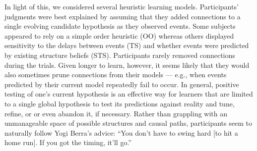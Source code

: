 \documentclass[10pt,letterpaper]{article}
\newcommand{\ttodo}[2][]
{\todo[caption={#2}, size=\small, #1, color = orange, inline]{\renewcommand{\baselinestretch}{1}\selectfont \textbf{TG}: #2}~}
\begin{document}
In light of this, we considered several heuristic learning models. Participants' judgments were best explained by assuming that they added connections to a single evolving candidate hypothesis as they observed events. Some subjects appeared to rely on a simple order heuristic (OO) whereas others displayed sensitivity to the delays between events (TS) and whether events were predicted by existing structure beliefs (STS).  Participants rarely removed connections during the trials. Given longer to learn, however, it seems likely that they would also sometimes prune connections from their models --- e.g., when events predicted by their current model repeatedly fail to occur.  In general, positive testing of one's current hypothesis is an effective way for learners that are limited to a single global hypothesis to test its predictions against reality and tune, refine, or or even abandon it, if necessary. Rather than grappling with an unmanageable space of possible structures and causal paths, participants seem to naturally follow Yogi Berra's advice: ``You don't have to swing hard [to hit a home run]. If you got the timing, it'll go.''





\setlength{\bibleftmargin}{.125in}
\setlength{\bibindent}{-\bibleftmargin}

\def\thebibliography#1{\section*{References}
\scriptsize
 \list
 {[\arabic{enumi}]}{\leftmargin \parindent
   \itemindent -\parindent
   \itemsep 0ex plus 1pt
   \parsep 0.1ex plus 1pt minus 1pt
   \usecounter{enumi}}
   \def\newblock{\hskip .11em plus .33em minus .07em}
   \sloppy\clubpenalty4000\widowpenalty4000
   \sfcode`\.=1000\relax}


\end{document}
